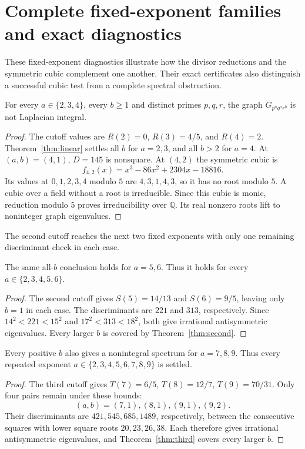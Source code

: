 \section{Complete fixed-exponent families and exact diagnostics}

These fixed-exponent diagnostics illustrate how the divisor reductions
and the symmetric cubic complement one another. Their exact certificates
also distinguish a successful cubic test from a complete spectral
obstruction.

\begin{theorem}
\label{thm:small}
For every $a\in\{2,3,4\}$, every $b\geq1$ and distinct primes $p,q,r$,
the graph $G_{p^a q^a r^b}$ is not Laplacian integral.
\end{theorem}
\begin{proof}
The cutoff values are $R(2)=0$, $R(3)=4/5$, and $R(4)=2$.
Theorem~\ref{thm:linear} settles all $b$ for $a=2,3$, and all $b>2$
for $a=4$. At $(a,b)=(4,1)$, $D=145$ is nonsquare.
At $(4,2)$ the symmetric cubic is
\[
f_{4,2}(x)=x^3-86x^2+2304x-18816.
\]
Its values at $0,1,2,3,4$ modulo $5$ are $4,3,1,4,3$, so it has
no root modulo $5$. A cubic over a field without a root is irreducible.
Since this cubic is monic, reduction modulo $5$ proves irreducibility over
$\mathbb Q$. Its real nonzero roots lift to noninteger graph eigenvalues.
\end{proof}

The second cutoff reaches the next two fixed exponents with only one
remaining discriminant check in each case.

\begin{corollary}
\label{cor:five-six}
The same all-$b$ conclusion holds for $a=5,6$. Thus it holds for every
$a\in\{2,3,4,5,6\}$.
\end{corollary}
\begin{proof}
The second cutoff gives $S(5)=14/13$ and $S(6)=9/5$, leaving only
$b=1$ in each case. The discriminants are $221$ and $313$, respectively.
Since $14^2<221<15^2$ and $17^2<313<18^2$, both give irrational
antisymmetric eigenvalues. Every larger $b$ is covered by
Theorem~\ref{thm:second}.
\end{proof}

\begin{corollary}
\label{cor:seven-nine}
Every positive $b$ also gives a nonintegral spectrum for $a=7,8,9$.
Thus every repeated exponent $a\in\{2,3,4,5,6,7,8,9\}$ is settled.
\end{corollary}
\begin{proof}
The third cutoff gives $T(7)=6/5$, $T(8)=12/7$, $T(9)=70/31$.
Only four pairs remain under these bounds:
\[
(a,b)=(7,1),(8,1),(9,1),(9,2).
\]
Their discriminants are $421,545,685,1489$, respectively, between the
consecutive squares with lower square roots $20,23,26,38$.
Each therefore gives irrational antisymmetric eigenvalues, and
Theorem~\ref{thm:third} covers every larger $b$.
\end{proof}

